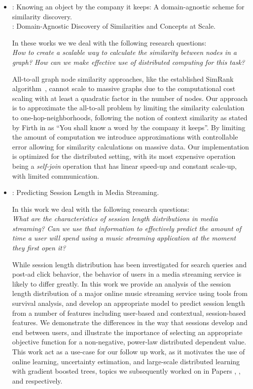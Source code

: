 \begin{itemize}
	\item \textbf{\conceptsicdm}: Knowing an object by the company it keeps: A domain-agnostic scheme
	for similarity discovery. \\
	\textbf{\conceptskais}: Domain-Agnostic Discovery of Similarities and Concepts at Scale.

	In these works we we deal with the following research questions:\\
	\emph{How to create a scalable way to calculate the similarity between nodes
	in a graph? How can we make effective use of distributed computing for this task?
	}

	All-to-all graph node similarity approaches, like the established SimRank algorithm~\cite{simrank},
	cannot scale to massive graphs due to the computational cost scaling with at least a quadratic
	factor in the number of nodes. Our approach is to approximate the all-to-all problem
	by limiting the similarity calculation to one-hop-neighborhoods, following the
	notion of context similarity as stated by Firth in \cite{firth} as ``You shall know
	a word by the company it keeps''. By limiting the amount of computation we introduce
	approximations with controllable error allowing for similarity calculations on massive
	data. Our implementation is optimized for the distributed setting, with its most
	expensive operation being a \emph{self-join} operation that has linear speed-up and
	constant scale-up, with limited communication.

	\item \textbf{\sessionlength}: Predicting Session Length in Media Streaming.

	In this work we deal with the following research questions:\\
	\emph{What are the characteristics of session length distributions in media streaming? Can we use that information to effectively predict the amount of time a user will spend using
	a music streaming application at the moment they first open it?}

	While session length distribution has been investigated for search
	queries and post-ad click behavior, the behavior of users in a media
	streaming service is likely to differ greatly.
	In this work we provide an analysis of the session length distribution
	of a major online music streaming service using tools from survival analysis, and develop an appropriate
	model to predict session length from a number of features including
	user-based and contextual, session-based features.
	We demonstrate the differences in the way that sessions develop and end
	between users, and illustrate the importance of selecting an appropriate
	objective function for a non-negative, power-law distributed dependent value.
	This work act as a use-case for our follow up work, as it motivates the use of online learning,
	uncertainty estimation, and large-scale distributed learning with gradient boosted
	trees, topics we subsequently worked on in Papers \boostvhtNum, \uncertaintreesNum,
	and \blockgbtNum respectively.


\end{itemize}
